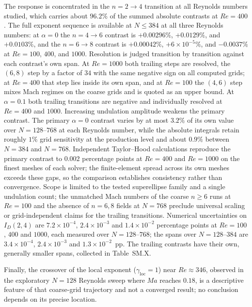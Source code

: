 The response is concentrated in the $n=2\to4$ transition at all Reynolds numbers studied, which carries about $96.2\%$ of the summed absolute contrasts at $Re=400$. The full exponent sequence is available at $N\le384$ at all three Reynolds numbers: at $\alpha=0$ the $n=4\to6$ contrast is $+0.00296\%$, $+0.0129\%$, and $+0.0103\%$, and the $n=6\to8$ contrast is $+0.00042\%$, $+6\times10^{-5}\%$, and $-0.0037\%$ at $Re=100$, $400$, and $1000$. Resolution is judged transition by transition against each contrast's own span. At $Re=1000$ both trailing steps are resolved, the $(6,8)$ step by a factor of $34$ with the same negative sign on all computed grids; at $Re=400$ that step lies inside its own span, and at $Re=100$ the $(4,6)$ step mixes Mach regimes on the coarse grids and is quoted as an upper bound. At $\alpha=0.1$ both trailing transitions are negative and individually resolved at $Re=400$ and $1000$. Increasing undulation amplitude weakens the primary contrast. The primary $\alpha=0$ contrast varies by at most $3.2\%$ of its own value over $N=128$--$768$ at each Reynolds number, while the absolute integrals retain roughly $1\%$ grid sensitivity at the production level and about $0.9\%$ between $N=384$ and $N=768$. Independent Taylor--Hood calculations reproduce the primary contrast to $0.002$ percentage points at $Re=400$ and $Re=1000$ on the finest meshes of each solver; the finite-element spread across its own meshes exceeds these gaps, so the comparison establishes consistency rather than convergence. Scope is limited to the tested superellipse family and a single undulation count; the unmatched Mach numbers of the coarse $n\ge6$ runs at $Re=100$ and the absence of $n=6,8$ fields at $N=768$ preclude universal scaling or grid-independent claims for the trailing transitions. Numerical uncertainties on $I_D(2,4)$ are $7.2\times10^{-4}$, $2.4\times10^{-3}$ and $1.4\times10^{-2}$ percentage points at $Re=100$, $400$ and $1000$, each measured over $N=128$--$768$; the spans over $N=128$--$384$ are $3.4\times10^{-4}$, $2.4\times10^{-3}$ and $1.3\times10^{-2}$~pp. The trailing contrasts have their own, generally smaller spans, collected in Table~SM.X.

Finally, the crossover of the local exponent ($\gamma_{\mathrm{loc}}=1$) near $Re\approx346$, observed in the exploratory $N=128$ Reynolds sweep where $Ma$ reaches $0.18$, is a descriptive feature of that coarse-grid trajectory and not a converged result; no conclusion depends on its precise location.

